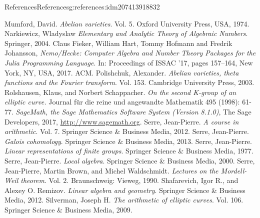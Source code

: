 \documentclass[oneside,10pt,]{book}
\numberwithin{equation}{section}
\begin{document}
\begin{references-chapter-numberless}{References}{}{References}{}{}{g:references:idm207413918832}
\begin{thebibliography}{9}
\hypertarget{x:biblio:bib-mumford-abvar}{}Mumford, David. \textit{Abelian varieties}. Vol. 5. Oxford University Press, USA, 1974.
\hypertarget{x:biblio:bib-narkiewicz}{}Narkiewicz, Wladyslaw  \textit{Elementary and Analytic Theory of Algebraic Numbers}. Springer, 2004.
\hypertarget{x:biblio:bib-nemo}{}Claus Fieker, William Hart, Tommy Hofmann and Fredrik Johansson, \textit{Nemo\slash{}Hecke: Computer Algebra and Number Theory Packages for the Julia Programming Language}. In: Proceedings of ISSAC '17, pages 157–164, New York, NY, USA, 2017. ACM.
\hypertarget{x:biblio:bib-polishchuck}{}Polishchuk, Alexander. \textit{Abelian varieties, theta functions and the Fourier transform}. Vol. 153. Cambridge University Press, 2003.
\hypertarget{x:biblio:bib-rolshausen}{}Rolshausen, Klaus, and Norbert Schappacher.  \textit{On the second K-group of an elliptic curve.}  Journal für die reine und angewandte Mathematik 495 (1998): 61-77.
\hypertarget{x:biblio:bib-sage}{}\textit{SageMath, the Sage Mathematics Software System (Version 8.1.0)}, The Sage Developers, 2017, \url{http://www.sagemath.org}.
\hypertarget{x:biblio:bib-serre-course}{}Serre, Jean-Pierre. \textit{A course in arithmetic}. Vol. 7. Springer Science \& Business Media, 2012.
\hypertarget{x:biblio:bib-serre-gal-coh}{}Serre, Jean-Pierre. \textit{Galois cohomology}. Springer Science \& Business Media, 2013.
\hypertarget{x:biblio:bib-serre-linear-reps}{}Serre, Jean-Pierre. \textit{Linear representations of finite groups}. Springer Science \& Business Media, 1977.
\hypertarget{x:biblio:bib-serre-local-alg}{}Serre, Jean-Pierre. \textit{Local algebra}. Springer Science \& Business Media, 2000.
\hypertarget{x:biblio:bib-serre-mordell-weil}{}Serre, Jean-Pierre, Martin Brown, and Michel Waldschmidt. \textit{Lectures on the Mordell-Weil theorem}. Vol. 2. Braunschweig: Vieweg, 1990.
\hypertarget{x:biblio:bib-shafarevich-remizov}{}Shafarevich, Igor R., and Alexey O. Remizov. \textit{Linear algebra and geometry}. Springer Science \& Business Media, 2012.
\hypertarget{x:biblio:bib-silverman}{}Silverman, Joseph H. \textit{The arithmetic of elliptic curves}. Vol. 106. Springer Science \& Business Media, 2009.

\end{thebibliography}
\end{references-chapter-numberless}
\end{document}
